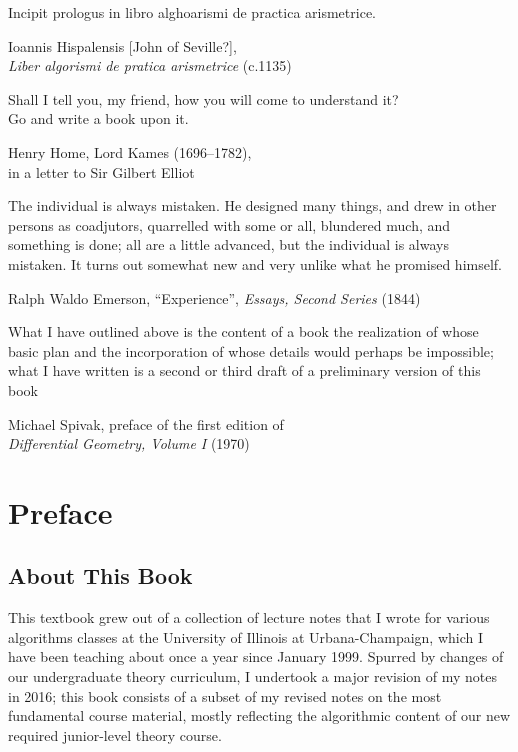 \epigraph{Incipit prologus in libro alghoarismi de practica arismetrice.}{Ioannis Hispalensis [John of Seville?],\\\textit{Liber algorismi de pratica arismetrice} (c.1135)}

\epigraph{Shall I tell you, my friend, how you will come to understand it?\\Go and write a book upon it.}{Henry Home, Lord Kames (1696–1782),\\in a letter to Sir Gilbert Elliot}

\epigraph{The individual is always mistaken. He designed many things, and drew in other persons as coadjutors, quarrelled with some or all, blundered much, and something is done; all are a little advanced, but the individual is always mistaken. It turns out somewhat new and very unlike what he promised himself.}{Ralph Waldo Emerson, “Experience”, \textit{Essays, Second Series} (1844)}

\epigraph{What I have outlined above is the content of a book the realization of whose basic plan and the incorporation of whose details would perhaps be impossible; what I have written is a second or third draft of a preliminary version of this book}{Michael Spivak, preface of the first edition of\\\textit{Differential Geometry, Volume I} (1970)}

\chapter*{Preface}

\section*{About This Book}

This textbook grew out of a collection of lecture notes that I wrote for various algorithms classes at the University of Illinois at Urbana-Champaign, which I have been teaching about once a year since January 1999. Spurred by changes of our undergraduate theory curriculum, I undertook a major revision of my notes in 2016; this book consists of a subset of my revised notes on the most fundamental course material, mostly reflecting the algorithmic content of our new required junior-level theory course.

